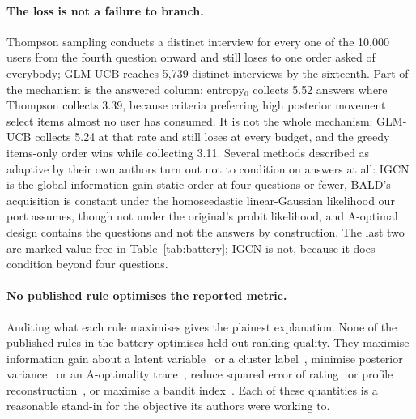 \documentclass[runningheads]{llncs}
\begin{document}
\paragraph{The loss is not a failure to branch.}
Thompson sampling conducts a distinct interview for every one of the 10{,}000 users from the fourth
question onward and still loses to one order asked of everybody; GLM-UCB reaches 5{,}739 distinct
interviews by the sixteenth. Part of the mechanism is the answered column: entropy$_0$ collects 5.52
answers where Thompson collects 3.39, because criteria preferring high posterior movement select
items almost no user has consumed. It is not the whole mechanism: GLM-UCB collects 5.24 at that rate
and still loses at every budget, and the greedy items-only order wins while collecting 3.11. Several methods described as adaptive by their own authors turn out not to condition on
answers at all: IGCN is the global information-gain static order at four questions or fewer, BALD's
acquisition is constant under the homoscedastic linear-Gaussian likelihood our port assumes, though
not under the original's probit likelihood, and A-optimal design contains the questions and not the
answers by construction. The last two are marked value-free in
Table~\ref{tab:battery}; IGCN is not, because it does condition beyond four questions.

\paragraph{No published rule optimises the reported metric.}
Auditing what each rule maximises gives the plainest explanation. None of the published rules in the
battery optimises held-out ranking quality. They maximise information gain about a latent variable~\cite{ma2019eddi}
or a cluster label~\cite{rashid2008learning}, minimise posterior
variance~\cite{houlsby2011bald} or an A-optimality trace~\cite{anava2015budget,sepliarskaia2018spq},
reduce squared error of rating~\cite{golbandi2011adaptive,zhou2011functional} or profile
reconstruction~\cite{kweon2020deep,proissl2024greedyslim}, or maximise a bandit
index~\cite{zhao2013interactive,zhang2020conucb,wang2023conlinucb,liu2025clisk,parapar2021dpe}.
Each of these quantities is a reasonable stand-in for the objective its authors were working to.
\end{document}
